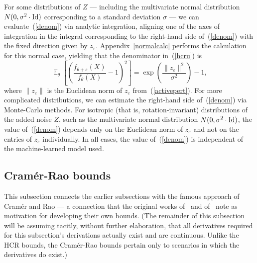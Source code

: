 \documentclass[]{fairmeta}
\DeclareMathOperator{\E}{\mathop{}\mathbb{E}}
\DeclareMathOperator{\Id}{{\rm Id}}
\renewcommand{\epsilon}{\varepsilon}
\begin{document}
For some distributions of $Z$ ---
including the multivariate normal distribution $N(0, \sigma^2 \cdot \Id)$
corresponding to a standard deviation $\sigma$ ---
we can evaluate~(\ref{denom}) via analytic integration,
aligning one of the axes of integration
in the integral corresponding to the right-hand side of~(\ref{denom})
with the fixed direction given by $z_{\epsilon}$.
Appendix~\ref{normalcalc} performs the calculation for this normal case,
yielding that the denominator in~(\ref{hcru}) is
%
\begin{equation}
\label{normalcase}
\E_{\theta}\left[\left(
           \frac{f_{\theta + \epsilon}(X)}{f_{\theta}(X)} - 1\right)^2 \right]
= \exp\left( \frac{\|z_{\epsilon}\|^2}{\sigma^2} \right) - 1,
\end{equation}
%
where $\|z_{\epsilon}\|$ is the Euclidean norm of $z_{\epsilon}$
from~(\ref{activepert}). For more complicated distributions,
we can estimate the right-hand side of~(\ref{denom}) via Monte-Carlo methods.
For isotropic (that is, rotation-invariant) distributions
of the added noise $Z$,
such as the multivariate normal distribution $N(0, \sigma^2 \cdot \Id)$,
the value of~(\ref{denom}) depends only on the Euclidean norm
of $z_{\epsilon}$ and not on the entries of $z_{\epsilon}$ individually.
In all cases, the value of~(\ref{denom}) is independent
of the machine-learned model used.


\subsection{Cram\'er-Rao bounds}
\label{cramer-rao}

This subsection connects the earlier subsections with the famous approach
of Cram\'er and Rao --- a connection that the original works
of~\cite{hammersley} and of~\cite{chapman-robbins} note
as motivation for developing their own bounds.
(The remainder of this subsection will be assuming tacitly,
without further elaboration, that all derivatives required
for this subsection's derivations actually exist and are continuous.
Unlike the HCR bounds, the Cram\'er-Rao bounds pertain only to scenarios
in which the derivatives do exist.)
\end{document}
